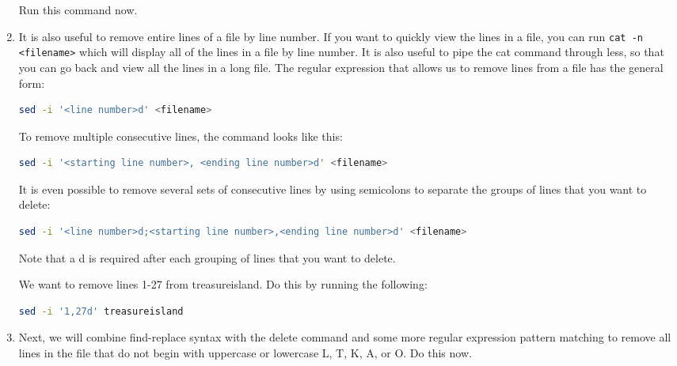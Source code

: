 \documentclass[11pt,a4paper]{article}
\begin{document}
\begin{enumerate}
Run this command now.

\item It is also useful to remove entire lines of a file by line number. If you want to quickly view the lines in a file, you can run \verb|cat -n <filename>| which will display all of the lines in a file by line number. It is also useful to pipe the cat command through less, so that you can go back and view all the lines in a long file. The regular expression that allows us to remove lines from a file has the general form:

\begin{lstlisting}[basicstyle=\ttfamily, backgroundcolor = \color{lightgray}, language = bash, xleftmargin = 0cm, framexleftmargin = 1em]
sed -i '<line number>d' <filename>
\end{lstlisting}

To remove multiple consecutive lines, the command looks like this:

\begin{lstlisting}[basicstyle=\ttfamily, backgroundcolor = \color{lightgray}, language = bash, xleftmargin = 0cm, framexleftmargin = 1em, breaklines=true]
sed -i '<starting line number>, <ending line number>d' <filename>
\end{lstlisting}

It is even possible to remove several sets of consecutive lines by using semicolons to separate the groups of lines that you want to delete:

\begin{lstlisting}[basicstyle=\ttfamily, backgroundcolor = \color{lightgray}, language = bash, xleftmargin = 0cm, framexleftmargin = 1em, breaklines=true]
sed -i '<line number>d;<starting line number>,<ending line number>d' <filename>
\end{lstlisting}

Note that a d is required after each grouping of lines that you want to delete.

We want to remove lines 1-27 from treasureisland. Do this by running the following:

\begin{lstlisting}[basicstyle=\ttfamily, backgroundcolor = \color{lightgray}, language = bash, xleftmargin = 0cm, framexleftmargin = 1em, breaklines=true]
sed -i '1,27d' treasureisland
\end{lstlisting}

\item Next, we will combine find-replace syntax with the delete command and some more regular expression pattern matching to remove all lines in the file that do not begin with uppercase or lowercase L, T, K, A, or O. Do this now.


\end{enumerate}
\end{document}
